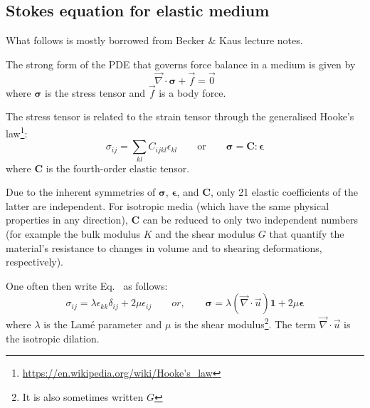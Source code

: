 \newpage
\subsection{Stokes equation for elastic medium}

What follows is mostly borrowed from Becker \& Kaus lecture notes.


The strong form of the PDE that governs force balance in a medium is given by
\[
\vec{\nabla}\cdot{\bm \sigma}  + \vec{f} = \vec{0}
\]
where ${\bm \sigma}$ is the stress tensor and $\vec{f}$ is a body force.

The stress tensor is related to the strain tensor through the generalised 
Hooke's law\footnote{\url{https://en.wikipedia.org/wiki/Hooke's_law}}:
\begin{equation}
\sigma_{ij}=\sum_{kl}C_{ijkl}\epsilon_{kl} 
\qquad
\text{or}
\qquad
{\bm \sigma} = {\bm C} : {\bm \epsilon}
\label{eq:one}
\end{equation}
where ${\bm C}$ is the fourth-order elastic tensor.

Due to the inherent symmetries of ${\bm \sigma}$, ${\bm \epsilon}$, and ${\bm C}$, 
only 21 elastic coefficients of the latter are independent. 
For isotropic media (which have the same physical properties in any direction), ${\bm C}$ 
can be reduced to only two independent numbers (for example the bulk modulus $K$ and the shear modulus $G$ 
that quantify the material's resistance to changes in volume and to shearing deformations, respectively). 

One often then write Eq.~\label{eq:one} as follows:
\begin{equation}
\sigma_{ij}=\lambda \epsilon_{kk} \delta_{ij} + 2\mu \epsilon_{ij}
\quad\quad
or, 
\quad\quad
{\bm \sigma} = \lambda (\vec{\nabla}\cdot\vec{u}) {\bm 1} + 2\mu {\bm \epsilon}   \label{eq:two}
\end{equation}
where $\lambda$ is the Lam\'e parameter and $\mu$ is the shear modulus\footnote{It is also sometimes written $G$}.
The term $\vec{\nabla}\cdot\vec{u}$ is the isotropic dilation.

